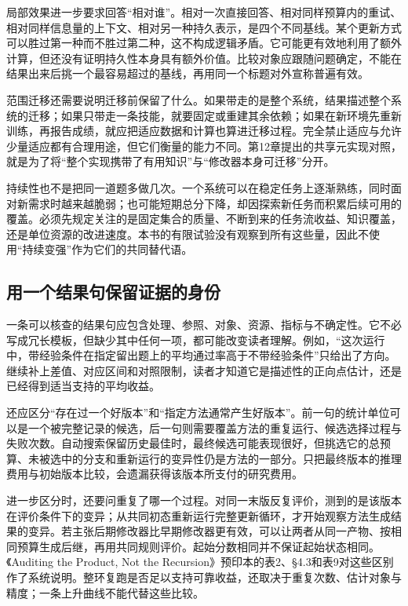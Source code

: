 局部效果进一步要求回答“相对谁”。相对一次直接回答、相对同样预算内的重试、相对同样信息量的上下文、相对另一种持久表示，是四个不同基线。某个更新方式可以胜过第一种而不胜过第二种，这不构成逻辑矛盾。它可能更有效地利用了额外计算，但还没有证明持久性本身具有额外价值。比较对象应跟随问题确定，不能在结果出来后挑一个最容易超过的基线，再用同一个标题对外宣称普遍有效。

范围迁移还需要说明迁移前保留了什么。如果带走的是整个系统，结果描述整个系统的迁移；如果只带走一条技能，就要固定或重建其余依赖；如果在新环境先重新训练，再报告成绩，就应把适应数据和计算也算进迁移过程。完全禁止适应与允许少量适应都有合理用途，但它们衡量的能力不同。第12章提出的共享元实现对照，就是为了将“整个实现携带了有用知识”与“修改器本身可迁移”分开。

持续性也不是把同一道题多做几次。一个系统可以在稳定任务上逐渐熟练，同时面对新需求时越来越脆弱；也可能短期总分下降，却因探索新任务而积累后续可用的覆盖。必须先规定关注的是固定集合的质量、不断到来的任务流收益、知识覆盖，还是单位资源的改进速度。本书的有限试验没有观察到所有这些量，因此不使用“持续变强”作为它们的共同替代语。

\subsection{用一个结果句保留证据的身份}

一条可以核查的结果句应包含处理、参照、对象、资源、指标与不确定性。它不必写成冗长模板，但缺少其中任何一项，都可能改变读者理解。例如，“这次运行中，带经验条件在指定留出题上的平均通过率高于不带经验条件”只给出了方向。继续补上差值、对应区间和对照限制，读者才知道它是描述性的正向点估计，还是已经得到适当支持的平均收益。

还应区分“存在过一个好版本”和“指定方法通常产生好版本”。前一句的统计单位可以是一个被完整记录的候选，后一句则需要覆盖方法的重复运行、候选选择过程与失败次数。自动搜索保留历史最佳时，最终候选可能表现很好，但挑选它的总预算、未被选中的分支和重新运行的变异性仍是方法的一部分。只把最终版本的推理费用与初始版本比较，会遗漏获得该版本所支付的研究费用。

进一步区分时，还要问重复了哪一个过程。对同一末版反复评价，测到的是该版本在评价条件下的变异；从共同初态重新运行完整更新循环，才开始观察方法生成结果的变异。若主张后期修改器比早期修改器更有效，可以让两者从同一产物、按相同预算生成后继，再用共同规则评价。起始分数相同并不保证起始状态相同。《Auditing the Product, Not the Recursion》预印本的表2、§4.3和表9对这些区别作了系统说明\cite{auditing-product-2610}。整环复跑是否足以支持可靠收益，还取决于重复次数、估计对象与精度；一条上升曲线不能代替这些比较。

